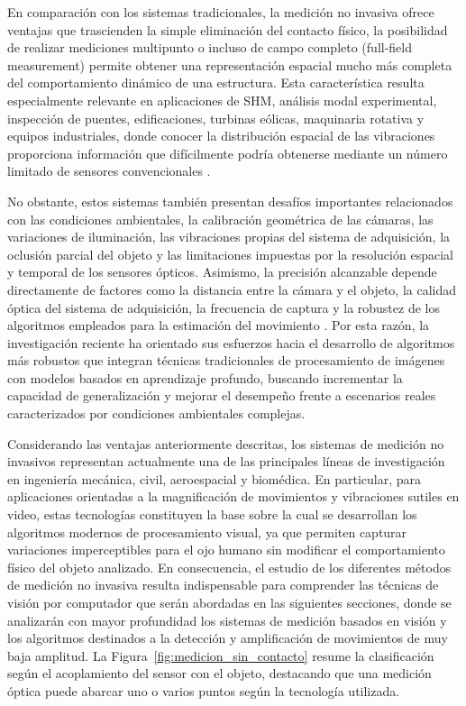En comparación con los sistemas tradicionales, la medición no invasiva ofrece ventajas que trascienden la simple eliminación del contacto físico, la posibilidad de realizar mediciones multipunto o incluso de campo completo (full-field measurement) permite obtener una representación espacial mucho más completa del comportamiento dinámico de una estructura. Esta característica resulta especialmente relevante en aplicaciones de \gls{SHM}, análisis modal experimental, inspección de puentes, edificaciones, turbinas eólicas, maquinaria rotativa y equipos industriales, donde conocer la distribución espacial de las vibraciones proporciona información que difícilmente podría obtenerse mediante un número limitado de sensores convencionales \cite{sutton2009correlation,cheng2025vision}.

No obstante, estos sistemas también presentan desafíos importantes relacionados con las condiciones ambientales, la calibración geométrica de las cámaras, las variaciones de iluminación, las vibraciones propias del sistema de adquisición, la oclusión parcial del objeto y las limitaciones impuestas por la resolución espacial y temporal de los sensores ópticos. Asimismo, la precisión alcanzable depende directamente de factores como la distancia entre la cámara y el objeto, la calidad óptica del sistema de adquisición, la frecuencia de captura y la robustez de los algoritmos empleados para la estimación del movimiento \cite{szeliski2022vision,cheng2025vision}. Por esta razón, la investigación reciente ha orientado sus esfuerzos hacia el desarrollo de algoritmos más robustos que integran técnicas tradicionales de procesamiento de imágenes con modelos basados en aprendizaje profundo, buscando incrementar la capacidad de generalización y mejorar el desempeño frente a escenarios reales caracterizados por condiciones ambientales complejas.

Considerando las ventajas anteriormente descritas, los sistemas de medición no invasivos representan actualmente una de las principales líneas de investigación en ingeniería mecánica, civil, aeroespacial y biomédica. En particular, para aplicaciones orientadas a la magnificación de movimientos y vibraciones sutiles en video, estas tecnologías constituyen la base sobre la cual se desarrollan los algoritmos modernos de procesamiento visual, ya que permiten capturar variaciones imperceptibles para el ojo humano sin modificar el comportamiento físico del objeto analizado. En consecuencia, el estudio de los diferentes métodos de medición no invasiva resulta indispensable para comprender las técnicas de visión por computador que serán abordadas en las siguientes secciones, donde se analizarán con mayor profundidad los sistemas de medición basados en visión y los algoritmos destinados a la detección y amplificación de movimientos de muy baja amplitud.
    La Figura~\ref{fig:medicion_sin_contacto} resume la clasificación según el acoplamiento del sensor con el objeto, destacando que una medición óptica puede abarcar uno o varios puntos según la tecnología utilizada.

